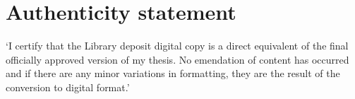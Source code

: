 \chapter*{Authenticity statement}
`I certify that the Library deposit digital copy is a direct equivalent of the final officially approved version of my thesis.
No emendation of content has occurred and if there are any minor variations in formatting, they are the result of the conversion to digital format.'

